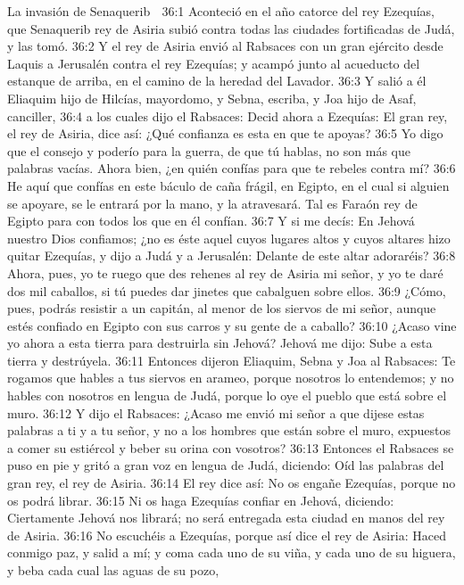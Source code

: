 La invasión de Senaquerib  

36:1 Aconteció en el año catorce del rey Ezequías, que Senaquerib rey de Asiria subió contra todas las ciudades fortificadas de Judá, y las tomó.  
36:2 Y el rey de Asiria envió al Rabsaces con un gran ejército desde Laquis a Jerusalén contra el rey Ezequías; y acampó junto al acueducto del estanque de arriba, en el camino de la heredad del Lavador.  
36:3 Y salió a él Eliaquim hijo de Hilcías, mayordomo, y Sebna, escriba, y Joa hijo de Asaf, canciller,  
36:4 a los cuales dijo el Rabsaces: Decid ahora a Ezequías: El gran rey, el rey de Asiria, dice así: ¿Qué confianza es esta en que te apoyas?  
36:5 Yo digo que el consejo y poderío para la guerra, de que tú hablas, no son más que palabras vacías. Ahora bien, ¿en quién confías para que te rebeles contra mí?  
36:6 He aquí que confías en este báculo de caña frágil, en Egipto, en el cual si alguien se apoyare, se le entrará por la mano, y la atravesará. Tal es Faraón rey de Egipto para con todos los que en él confían.  
36:7 Y si me decís: En Jehová nuestro Dios confiamos; ¿no es éste aquel cuyos lugares altos y cuyos altares hizo quitar Ezequías, y dijo a Judá y a Jerusalén: Delante de este altar adoraréis?  
36:8 Ahora, pues, yo te ruego que des rehenes al rey de Asiria mi señor, y yo te daré dos mil caballos, si tú puedes dar jinetes que cabalguen sobre ellos.  
36:9 ¿Cómo, pues, podrás resistir a un capitán, al menor de los siervos de mi señor, aunque estés confiado en Egipto con sus carros y su gente de a caballo?  
36:10 ¿Acaso vine yo ahora a esta tierra para destruirla sin Jehová? Jehová me dijo: Sube a esta tierra y destrúyela.  
36:11 Entonces dijeron Eliaquim, Sebna y Joa al Rabsaces: Te rogamos que hables a tus siervos en arameo, porque nosotros lo entendemos; y no hables con nosotros en lengua de Judá, porque lo oye el pueblo que está sobre el muro.  
36:12 Y dijo el Rabsaces: ¿Acaso me envió mi señor a que dijese estas palabras a ti y a tu señor, y no a los hombres que están sobre el muro, expuestos a comer su estiércol y beber su orina con vosotros?  
36:13 Entonces el Rabsaces se puso en pie y gritó a gran voz en lengua de Judá, diciendo: Oíd las palabras del gran rey, el rey de Asiria.  
36:14 El rey dice así: No os engañe Ezequías, porque no os podrá librar.  
36:15 Ni os haga Ezequías confiar en Jehová, diciendo: Ciertamente Jehová nos librará; no será entregada esta ciudad en manos del rey de Asiria.  
36:16 No escuchéis a Ezequías, porque así dice el rey de Asiria: Haced conmigo paz, y salid a mí; y coma cada uno de su viña, y cada uno de su higuera, y beba cada cual las aguas de su pozo,  
